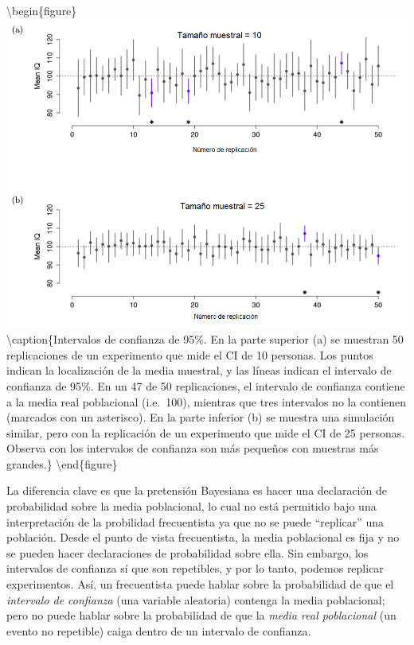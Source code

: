 \documentclass[spanish,]{book}
\begin{document}
\textbackslash{}begin\{figure\}
\includegraphics[width=13.75in]{img/estimation/confIntReplicated}
\textbackslash{}caption\{Intervalos de confianza de 95\%. En la parte
superior (a) se muestran 50 replicaciones de un experimento que mide el
CI de 10 personas. Los puntos indican la localización de la media
muestral, y las líneas indican el intervalo de confianza de 95\%. En un
47 de 50 replicaciones, el intervalo de confianza contiene a la media
real poblacional (i.e.~100), mientras que tres intervalos no la
contienen (marcados con un asterisco). En la parte inferior (b) se
muestra una simulación similar, pero con la replicación de un
experimento que mide el CI de 25 personas. Observa con los intervalos de
confianza son más pequeños con muestras más grandes.\}\label{fig:cirep}
\textbackslash{}end\{figure\}

La diferencia clave es que la pretensión Bayesiana es hacer una
declaración de probabilidad sobre la media poblacional, lo cual no está
permitido bajo una interpretación de la probilidad frecuentista ya que
no se puede ``replicar'' una población. Desde el punto de vista
frecuentista, la media poblacional es fija y no se pueden hacer
declaraciones de probabilidad sobre ella. Sin embargo, los intervalos de
confianza sí que son repetibles, y por lo tanto, podemos replicar
experimentos. Así, un frecuentista puede hablar sobre la probabilidad de
que el \emph{intervalo de confianza} (una variable aleatoria) contenga
la media poblacional; pero no puede hablar sobre la probabilidad de que
la \emph{media real poblacional} (un evento no repetible) caiga dentro
de un intervalo de confianza.
\end{document}
